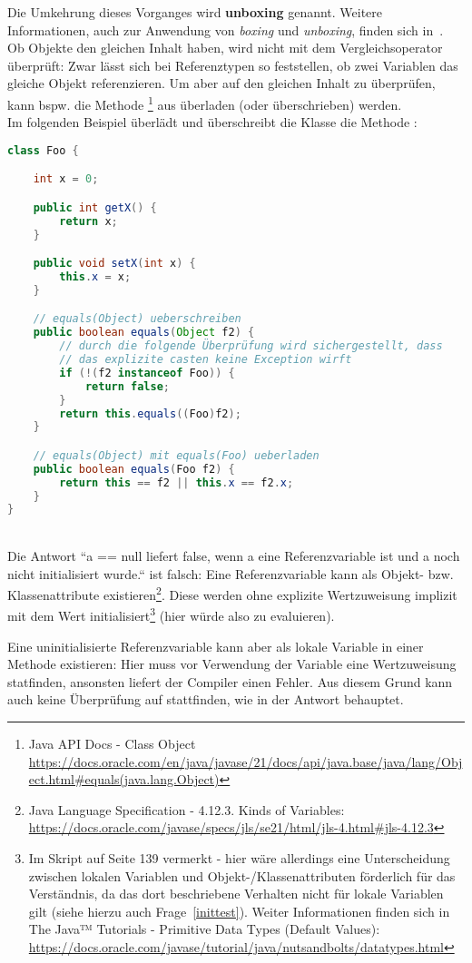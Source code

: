 Die Umkehrung dieses Vorganges wird \textbf{unboxing} genannt. Weitere Informationen, auch zur Anwendung
von \textit{boxing} und \textit{unboxing}, finden sich in~\cite[732 ff]{Ull12}.\\

Ob Objekte den gleichen Inhalt haben, wird nicht mit dem Vergleichsoperator \code{==} überprüft: Zwar lässt sich bei Referenztypen
so feststellen, ob zwei Variablen das gleiche Objekt referenzieren.
Um aber auf den gleichen Inhalt zu überprüfen, kann bspw. die Methode \footnote{
    Java API Docs - Class Object \url{https://docs.oracle.com/en/java/javase/21/docs/api/java.base/java/lang/Object.html#equals(java.lang.Object)}
} aus  überladen (oder überschrieben) werden.\\

Im folgenden Beispiel überlädt und überschreibt die Klasse  die Methode :

\begin{lstlisting}[language=java]
class Foo {

    int x = 0;

    public int getX() {
        return x;
    }

    public void setX(int x) {
        this.x = x;
    }

    // equals(Object) ueberschreiben
    public boolean equals(Object f2) {
        // durch die folgende Überprüfung wird sichergestellt, dass
        // das explizite casten keine Exception wirft
        if (!(f2 instanceof Foo)) {
            return false;
        }
        return this.equals((Foo)f2);
    }

    // equals(Object) mit equals(Foo) ueberladen
    public boolean equals(Foo f2) {
        return this == f2 || this.x == f2.x;
    }
}
\end{lstlisting}\\

Die Antwort ``a == null liefert false, wenn a eine Referenzvariable ist und a noch nicht initialisiert wurde.`` ist falsch:
Eine Referenzvariable kann als Objekt- bzw. Klassenattribute existieren\footnote{
    Java Language Specification - 4.12.3. Kinds of Variables: \url{https://docs.oracle.com/javase/specs/jls/se21/html/jls-4.html#jls-4.12.3}
}.
Diese werden ohne explizite Wertzuweisung implizit mit dem Wert  initialisiert\footnote{
    Im Skript auf Seite 139 vermerkt - hier wäre allerdings eine Unterscheidung zwischen lokalen Variablen und Objekt-/Klassenattributen
    förderlich für das Verständnis, da das dort beschriebene Verhalten nicht für lokale Variablen gilt (siehe hierzu auch Frage~\ref{inittest}).
    Weiter Informationen finden sich in The Java™ Tutorials - Primitive Data Types (Default Values): \url{https://docs.oracle.com/javase/tutorial/java/nutsandbolts/datatypes.html}
} (hier würde  also zu  evaluieren).

Eine uninitialisierte Referenzvariable kann aber als lokale Variable in einer Methode existieren: Hier muss vor Verwendung
der Variable eine Wertzuweisung statfinden, ansonsten liefert der Compiler einen Fehler.
Aus diesem Grund kann auch keine Überprüfung auf  stattfinden, wie in der Antwort behauptet.

